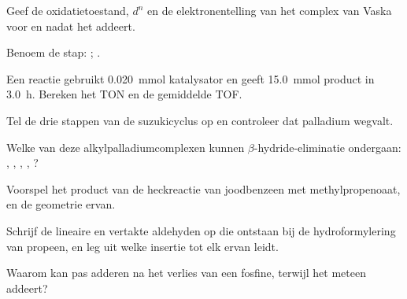 \begin{exercise}[$\star$]\label{exo:b2:catalytic-cycles:1}
Geef de oxidatietoestand, $d^n$ en de elektronentelling van het complex van Vaska
 voor en nadat het  addeert.
\end{exercise}

\begin{exercise}[$\star$]\label{exo:b2:catalytic-cycles:2}
Benoem de stap: ; .
\end{exercise}

\begin{exercise}[$\star$]\label{exo:b2:catalytic-cycles:3}
Een reactie gebruikt \qty{0.020}{mmol} katalysator en geeft \qty{15.0}{mmol} product in
\qty{3.0}{h}. Bereken het TON en de gemiddelde TOF.
\end{exercise}

\begin{exercise}[$\star$]\label{exo:b2:catalytic-cycles:4}
Tel de drie stappen van de suzukicyclus op en controleer dat palladium wegvalt.
\end{exercise}

\begin{exercise}[$\star\star$]\label{exo:b2:catalytic-cycles:5}
Welke van deze alkylpalladiumcomplexen kunnen $\beta$-hydride-eliminatie ondergaan:
, , , , ?
\end{exercise}

\begin{exercise}[$\star\star$]\label{exo:b2:catalytic-cycles:6}
Voorspel het product van de heckreactie van joodbenzeen met methylpropenoaat, en de
geometrie ervan.
\end{exercise}

\begin{exercise}[$\star\star$]\label{exo:b2:catalytic-cycles:7}
Schrijf de lineaire en vertakte aldehyden op die ontstaan bij de hydroformylering van propeen, en
leg uit welke insertie tot elk ervan leidt.
\end{exercise}

\begin{exercise}[$\star\star$]\label{exo:b2:catalytic-cycles:8}
Waarom kan  pas  adderen na het verlies van een fosfine, terwijl
 het meteen addeert?
\end{exercise}

